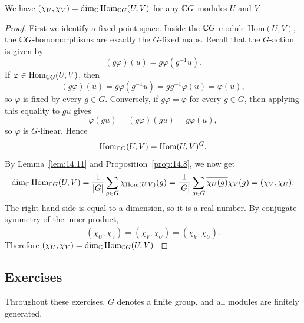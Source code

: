 \documentclass[../Odyssey_Project.tex]{subfiles}
\begin{document}
\begin{theorem}
\label{thm:14.12}
We have $(\chi_U, \chi_V) = \dim_{\mathbb{C}} \mathrm{Hom}_{\mathbb{C} G}(U, V)$ for any $\mathbb{C} G$-modules $U$ and $V$.
\end{theorem}
\begin{proof}
    First we identify a fixed-point space. Inside the $\mathbb{C} G$-module $\mathrm{Hom}(U,V)$, the $\mathbb{C} G$-homomorphisms are exactly the $G$-fixed maps. Recall that the $G$-action is given by
    \[
        (g\varphi)(u)=g\varphi(g^{-1}u).
    \]
    If $\varphi \in \mathrm{Hom}_{\mathbb{C} G}(U,V)$, then
    \[
        (g\varphi)(u)=g\varphi(g^{-1}u)=gg^{-1}\varphi(u)=\varphi(u),
    \]
    so $\varphi$ is fixed by every $g \in G$. Conversely, if $g\varphi=\varphi$ for every $g \in G$, then applying this equality to $gu$ gives
    \[
        \varphi(gu)=(g\varphi)(gu)=g\varphi(u),
    \]
    so $\varphi$ is $G$-linear. Hence
    \[
        \mathrm{Hom}_{\mathbb{C} G}(U,V)=\mathrm{Hom}(U,V)^G.
    \]
    By Lemma~\ref{lem:14.11} and Proposition~\ref{prop:14.8}, we now get
    \[
        \dim_{\mathbb{C}}\mathrm{Hom}_{\mathbb{C} G}(U,V)
        =
        \frac{1}{|G|}\sum_{g \in G}\chi_{\mathrm{Hom}(U,V)}(g)
        =
        \frac{1}{|G|}\sum_{g \in G}\overline{\chi_U(g)}\chi_V(g)
        =
        (\chi_V,\chi_U).
    \]
    The right-hand side is equal to a dimension, so it is a real number. By conjugate symmetry of the inner product,
    \[
        (\chi_U,\chi_V)=\overline{(\chi_V,\chi_U)}=(\chi_V,\chi_U).
    \]
    Therefore $(\chi_U,\chi_V)=\dim_{\mathbb{C}}\mathrm{Hom}_{\mathbb{C} G}(U,V)$.
\end{proof}

\subsection*{Exercises}

Throughout these exercises, $G$ denotes a finite group, and all modules are finitely generated.
\end{document}
